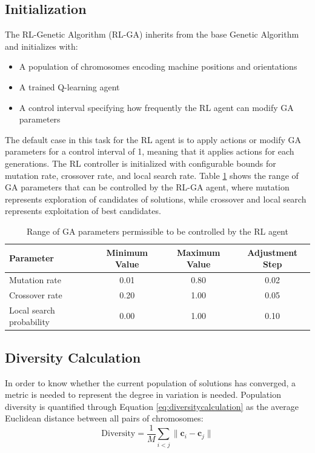 \documentclass{article}
\begin{document}
\subsection{Initialization}
The RL-Genetic Algorithm (RL-GA) inherits from the base Genetic Algorithm and initializes with:
\begin{itemize}
    \item A population of chromosomes encoding machine positions and orientations
    \item A trained Q-learning agent
    \item A control interval specifying how frequently the RL agent can modify GA parameters
\end{itemize}
The default case in this task for the RL agent is to apply actions or modify GA parameters for a control interval of 1, meaning that it applies actions for each generations. The RL controller is initialized with configurable bounds for mutation rate, crossover rate, and local search rate. Table \ref{tab:rl_parameter_range} shows the range of GA parameters that can be controlled by the RL-GA agent, where mutation represents exploration of candidates of solutions, while crossover and local search represents exploitation of best candidates.
\begin{table}[H]
\centering
\begin{tabular}{lccc}
\toprule
\textbf{Parameter} & \textbf{Minimum Value} & \textbf{Maximum Value} & \textbf{Adjustment Step} \\
\midrule
Mutation rate & 0.01 & 0.80 & 0.02 \\
Crossover rate & 0.20 & 1.00 & 0.05 \\
Local search probability & 0.00 & 1.00 & 0.10 \\
\bottomrule
\end{tabular}
\caption{Range of GA parameters permissible to be controlled by the RL agent}
\label{tab:rl_parameter_range}
\end{table}
\subsection{Diversity Calculation}
In order to know whether the current population of solutions has converged, a metric is needed to represent the degree in variation is needed. Population diversity is quantified through Equation \ref{eq:diversitycalculation} as the average Euclidean distance between all pairs of chromosomes:
\begin{equation}
\text{Diversity} = \frac{1}{M} \sum_{i<j} \lVert \mathbf{c}_i - \mathbf{c}_j \rVert
\label{eq:diversitycalculation}
\end{equation}
\end{document}
